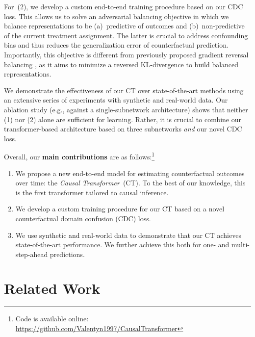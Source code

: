\documentclass{article}
\theoremstyle{plain}
\theoremstyle{definition}
\theoremstyle{remark}
\newcommand{\longname}{\emph{Causal Transformer}\xspace}
\newcommand{\shortname}{CT\xspace}
\begin{document}
For~(2), we develop a custom end-to-end training procedure based on our CDC loss. This allows us to solve an adversarial balancing objective in which we balance representations to be (a)~predictive of outcomes and (b)~non-predictive of the current treatment assignment. The latter is crucial to address confounding bias and thus reduces the generalization error of counterfactual prediction. Importantly, this objective is different from previously proposed gradient reversal balancing \cite{ganin2015unsupervised, bica2020estimating}, as it aims to minimize a reversed KL-divergence to build balanced representations.

We demonstrate the effectiveness of our \shortname over state-of-the-art methods using an extensive series of experiments with synthetic and real-world data. Our ablation study (e.g., against a single-subnetwork architecture) shows that neither (1) nor (2) alone are sufficient for learning. Rather, it is crucial to combine our transformer-based architecture based on three subnetworks \emph{and} our novel CDC loss.   


Overall, our \textbf{main contributions} are as follows:\footnote{Code is available online: \url{https://github.com/Valentyn1997/CausalTransformer}}
\vspace{-0.2cm}
\begin{enumerate}[noitemsep]
\item We propose a new end-to-end model for estimating counterfactual outcomes over time: the \longname~(\shortname). To the best of our knowledge, this is the first transformer tailored to causal inference. 
\item We develop a custom training procedure for our \shortname based on a novel counterfactual domain confusion (CDC) loss.
\item We use synthetic and real-world data to demonstrate that our \shortname achieves state-of-the-art performance. We further achieve this both for one- and multi-step-ahead predictions. 
\end{enumerate}
\vspace{-0.3cm}

\section{Related Work} 
\label{sec:related-work}
\end{document}
